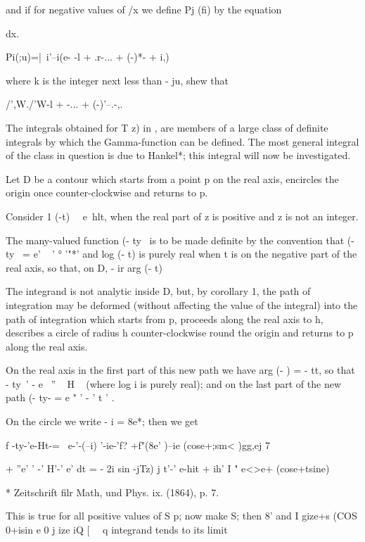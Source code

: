 and if for negative values of /x we define Pj (fi) by the equation

dx.

Pi(;u)=|\ i'--i(e- -l + .r-... + (-)*- + i,)

where k is the integer next less than - ju, shew that

/',W./'W-l + -... + (-)'--.-,. 


The integrals obtained for T z) in
,  %
are members of a
large class of definite integrals by which the Gamma-function can be
defined. The most general integral of the class in question is due to
Hankel*; this integral will now be investigated.

Let D be a contour which starts from a point p on the real axis,
encircles the origin once counter-clockwise and returns to p.

Consider 1 (-t)~~ e~hlt, when the real part of z is positive and z is
not an integer.

The many-valued function (- ty~ is to be made definite by the
convention that (- ty~ = e' ~ ' ° '"*' and log (- t) is purely real
when t is on the negative part of the real axis, so that, on D, - ir %
arg (- t) %

The integrand is not analytic inside D, but, by corollary 1, the
path of integration may be deformed (without affecting the value of
the integral) into the path of integration which starts from p,
proceeds along the real axis to h, describes a circle of radius h
counter-clockwise round the origin and returns to p along the real
axis.

On the real axis in the first part of this new path we have arg (- ) =
- tt, so that - ty~' - e~ '' ~ H ~ (where log i is purely real); and
on the last part of the new path (- ty- = e " ' - ' t ' .

On the circle we write - i = 8e*; then we get

f -ty-'e-Ht-= \ e-'-(--i) '-ie-'f? +f"(8e' )--ie (cose+;sm< )gg,ej 7

+ ''e' ' -' H'-' e' dt = - 2i sin -jTz) j t'-' e-hit + ih' I " e<>e+
(cose+tsine) \

* Zeitschrift filr Math, und Phys. ix. (1864), p. 7.

%
%

This is true for all positive values of S p; now make S; then 8' and
I gize+s (COS 0+isin e 0 j ize iQ [ \ \ q integrand tends to its limit

